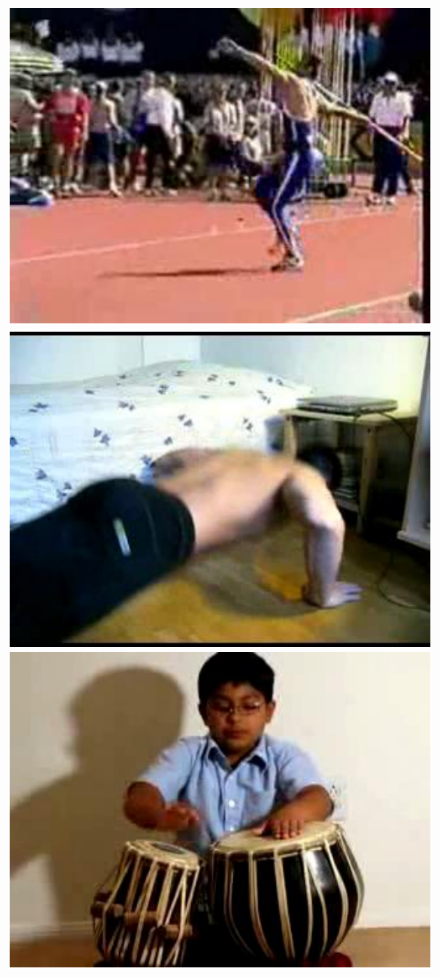 \documentclass[10pt,twocolumn,letterpaper]{article}
\begin{document}
\begin{figure}[!t]
\begin{center}
\includegraphics[scale=0.25]{figures/dataset_thumb/ucf/crop_class2.pdf}
\includegraphics[scale=0.25]{figures/dataset_thumb/ucf/crop_class3.pdf} 
\includegraphics[scale=0.25]{figures/dataset_thumb/ucf/crop_class4.pdf} 

\end{center}
\end{figure}
\end{document}
